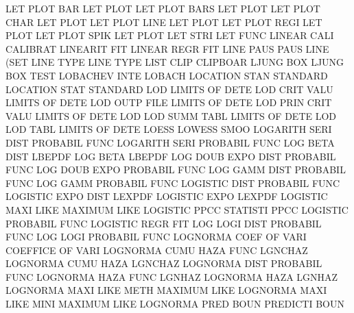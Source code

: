 LET      PLOT BAR                       LET      PLOT
LET      PLOT BARS                      LET      PLOT
LET      PLOT CHAR                      LET      PLOT
LET      PLOT LINE                      LET      PLOT
LET      PLOT REGI                      LET      PLOT
LET      PLOT SPIK                      LET      PLOT
LET      STRI                           LET      FUNC
LINEAR   CALI                           CALIBRAT
LINEARIT                                FIT
LINEAR   REGR                           FIT
LINE     PAUS                           PAUS     LINE (SET
LINE     TYPE                           LINE     TYPE
LIST     CLIP                           CLIPBOAR
LJUNG    BOX                            LJUNG    BOX  TEST
LOBACHEV INTE                           LOBACH
LOCATION STAN                           STANDARD
LOCATION STAT                           STANDARD
LOD                                     LIMITS   OF   DETE
LOD      CRIT VALU                      LIMITS   OF   DETE
LOD      OUTP FILE                      LIMITS   OF   DETE
LOD      PRIN CRIT VALU                 LIMITS   OF   DETE
LOD      LOD  SUMM TABL                 LIMITS   OF   DETE
LOD      LOD  TABL                      LIMITS   OF   DETE
LOESS                                   LOWESS   SMOO
LOGARITH SERI DIST                      PROBABIL FUNC
LOGARITH SERI                           PROBABIL FUNC
LOG      BETA DIST                      LBEPDF
LOG      BETA                           LBEPDF
LOG      DOUB EXPO DIST                 PROBABIL FUNC
LOG      DOUB EXPO                      PROBABIL FUNC
LOG      GAMM DIST                      PROBABIL FUNC
LOG      GAMM                           PROBABIL FUNC
LOGISTIC DIST                           PROBABIL FUNC
LOGISTIC EXPO DIST                      LEXPDF
LOGISTIC EXPO                           LEXPDF
LOGISTIC MAXI LIKE                      MAXIMUM  LIKE
LOGISTIC PPCC                           STATISTI PPCC
LOGISTIC                                PROBABIL FUNC
LOGISTIC REGR                           FIT
LOG      LOGI DIST                      PROBABIL FUNC
LOG      LOGI                           PROBABIL FUNC
LOGNORMA COEF OF   VARI                 COEFFICE OF   VARI
LOGNORMA CUMU HAZA FUNC                 LGNCHAZ
LOGNORMA CUMU HAZA                      LGNCHAZ
LOGNORMA DIST                           PROBABIL FUNC
LOGNORMA HAZA FUNC                      LGNHAZ
LOGNORMA HAZA                           LGNHAZ
LOGNORMA MAXI LIKE METH                 MAXIMUM  LIKE
LOGNORMA MAXI LIKE MINI                 MAXIMUM  LIKE
LOGNORMA PRED BOUN                      PREDICTI BOUN
